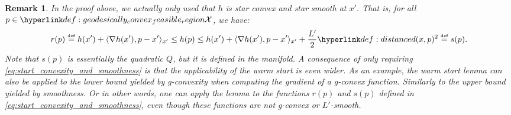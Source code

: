 \documentclass[12pt]{alt2021}
\newtheorem{remark}[theorem]{Remark}
\newcommand{\defi}{\stackrel{\mathrm{\scriptscriptstyle def}}{=}}
\newcommand{\innp}[1]{\langle #1 \rangle}
\begin{document}
\begin{remark}
In the proof above, we actually only used that $h$ is star convex and star smooth at $x'$. That is, for all $p \in \X$, we have:
\begin{equation}\label{eq:start_convexity_and_smoothness}
    r(p) \defi h(x') + \innp{\nabla h(x'), p-x'}_{x'}  \leq  h(p) \leq h(x') + \innp{\nabla h(x'), p-x'}_{x'} + \frac{L'}{2}\dist(x, p)^2 \defi s(p).
\end{equation}
    Note that $s(p)$ is essentially the quadratic $Q$, but it is defined in the manifold. A consequence of only requiring \eqref{eq:start_convexity_and_smoothness} is that the applicability of the warm start is even wider. As an example, the warm start lemma can also be applied to the lower bound yielded by g-convexity when computing the gradient of a g-convex function. Similarly to the upper bound yielded by smoothness. Or in other words, one can apply the lemma to the functions $r(p)$ and $s(p)$ defined in \eqref{eq:start_convexity_and_smoothness}, even though these functions are not g-convex or $L'$-smooth.
\end{remark}
\end{document}
